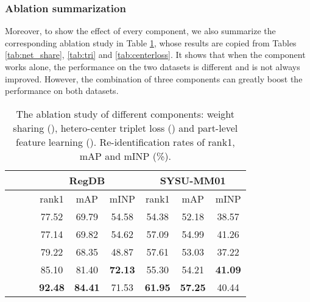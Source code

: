 \documentclass[journal]{IEEEtran}
\begin{document}
\subsubsection{Ablation summarization}
\label{sssec:ablasum}
Moreover, to show the effect of every component, we also summarize the corresponding ablation study in Table \ref{tab:ablation}, whose results are copied from Tables \ref{tab:net_share}, \ref{tab:tri} and \ref{tab:centerloss}. It shows that when the component works alone, the performance on the two datasets is different and is not always improved. However, the combination of three components can greatly boost the performance on both datasets.

\begin{table}
\scriptsize
\caption{The ablation study of different components: weight sharing (), hetero-center triplet loss () and part-level feature learning (). Re-identification rates of rank1, mAP and mINP (\%).}
\label{tab:ablation}
  \centering
\begin{tabular}{c|c|c|c|c|c|c|c|c}
   \toprule[2pt]
    \multicolumn{3}{c|}{} & \multicolumn{3}{c|}{RegDB} & \multicolumn{3}{c}{SYSU-MM01}\\ \hline
     &  &  & rank1 & mAP & mINP & rank1 & mAP & mINP \\ \toprule[1pt]
     &  &  & 77.52 & 69.79 & 54.58 & 54.38 & 52.18 & 38.57 \\
     &  &  & 77.14 & 69.82 & 54.62 & 57.09 & 54.99 & 41.26 \\
     &  &  & 79.22 & 68.35 & 48.87 & 57.61 & 53.03 & 37.22 \\
     &  &  & 85.10 & 81.40 & \textbf{72.13} & 55.30 & 54.21 & \textbf{41.09} \\
     &  &  & \textbf{92.48} & \textbf{84.41} & 71.53 & \textbf{61.95} & \textbf{57.25} & 40.44 \\
     \toprule[2pt]
  \end{tabular}
\end{table}
\end{document}
